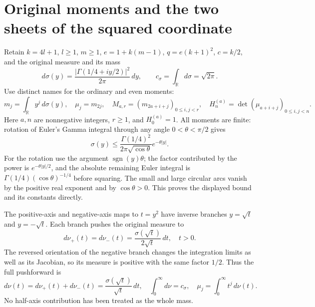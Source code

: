 


\section{Original moments and the two sheets of the squared coordinate}

Retain $k=4l+1$, $l\geq1$, $m\geq1$,
$e=1+k(m-1)$, $q=e(k+1)^2$, $c=k/2$, and the original
measure and its mass
\[
 d\sigma(y)=\frac{|\Gamma(1/4+iy/2)|^2}{2\pi}\,dy,
 \qquad c_\sigma=\int_{\mathbb R}d\sigma=\sqrt{2\pi}.
\tag{PHT1}
\]
Use distinct names for the ordinary and even moments:
\[
 m_j=\int_{\mathbb R}y^j\,d\sigma(y),\quad
 \mu_j=m_{2j},\quad
 M_{a,r}=(m_{2a+i+j})_{0\leq i,j<r},\quad
 H_n^{(a)}=\det(\mu_{a+i+j})_{0\leq i,j<n}.
\tag{PHT2}
\]
Here $a,n$ are nonnegative integers, $r\geq1$, and
$H_0^{(a)}=1$. All moments are finite: rotation of Euler's
Gamma integral through any angle $0<\theta<\pi/2$ gives
\[
 \sigma(y)\leq\frac{\Gamma(1/4)^2}{2\pi\sqrt{\cos\theta}}
                         e^{-\theta|y|}.
\]
For the rotation use the argument $\operatorname{sgn}(y)\theta$;
the factor contributed by the power is $e^{-\theta|y|/2}$,
and the absolute remaining Euler integral is
$\Gamma(1/4)(\cos\theta)^{-1/4}$ before squaring.
The small and large circular arcs vanish by the positive
real exponent and by $\cos\theta>0$. This proves the displayed
bound and its constants directly.

The positive-axis and negative-axis maps to $t=y^2$ have
inverse branches $y=\sqrt t$ and $y=-\sqrt t$. Each branch
pushes the original measure to
\[
 d\nu_+(t)=d\nu_-(t)=\frac{\sigma(\sqrt t)}{2\sqrt t}\,dt,
 \quad t>0.
\]
The reversed orientation of the negative branch changes the
integration limits as well as its Jacobian, so its measure is
positive with the same factor $1/2$. Thus the full pushforward is
\[
 d\nu(t)=d\nu_+(t)+d\nu_-(t)
        =\frac{\sigma(\sqrt t)}{\sqrt t}\,dt,
 \quad\int_0^\infty d\nu=c_\sigma,
 \quad\mu_j=\int_0^\infty t^j\,d\nu(t).
\tag{PHT3}
\]
No half-axis contribution has been treated as the whole mass.

